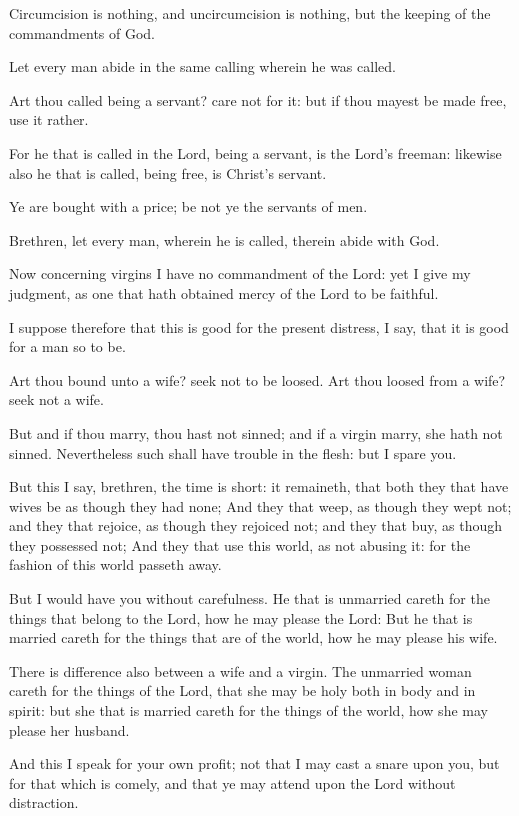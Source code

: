 \Verse Circumcision is nothing, and uncircumcision is nothing, but the keeping of the commandments of God.

\Verse Let every man abide in the same calling wherein he was called.

\Verse Art thou called being a servant? care not for it: but if thou mayest be made free, use it rather.

\Verse For he that is called in the Lord, being a servant, is the Lord's freeman: likewise also he that is called, being free, is Christ's servant.

\Verse Ye are bought with a price; be not ye the servants of men.

\Verse Brethren, let every man, wherein he is called, therein abide with God.

\Verse Now concerning virgins I have no commandment of the Lord: yet I give my judgment, as one that hath obtained mercy of the Lord to be faithful.

\Verse I suppose therefore that this is good for the present distress, I say, that it is good for a man so to be.

\Verse Art thou bound unto a wife? seek not to be loosed. Art thou loosed from a wife? seek not a wife.

\Verse But and if thou marry, thou hast not sinned; and if a virgin marry, she hath not sinned. Nevertheless such shall have trouble in the flesh: but I spare you.

\Verse But this I say, brethren, the time is short: it remaineth, that both they that have wives be as though they had none; \Verse And they that weep, as though they wept not; and they that rejoice, as though they rejoiced not; and they that buy, as though they possessed not; \Verse And they that use this world, as not abusing it: for the fashion of this world passeth away.

\Verse But I would have you without carefulness. He that is unmarried careth for the things that belong to the Lord, how he may please the Lord: \Verse But he that is married careth for the things that are of the world, how he may please his wife.

\Verse There is difference also between a wife and a virgin. The unmarried woman careth for the things of the Lord, that she may be holy both in body and in spirit: but she that is married careth for the things of the world, how she may please her husband.

\Verse And this I speak for your own profit; not that I may cast a snare upon you, but for that which is comely, and that ye may attend upon the Lord without distraction.

